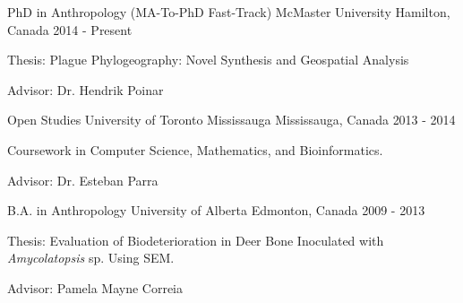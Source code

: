 

\begin{cventries}
  \cventry
    {PhD in Anthropology (MA-To-PhD Fast-Track)} %
    {McMaster University} %
    {Hamilton, Canada} %
    {2014 - Present} %
    {
      \begin{cvitems} %
        \item {Thesis:  Plague Phylogeography: Novel Synthesis and Geospatial Analysis}
         \item {Advisor: Dr. Hendrik Poinar}
      \end{cvitems}
    }
  \cventry
    {Open Studies} %
    {University of Toronto Mississauga} %
    {Mississauga, Canada} %
    {2013 - 2014} %
    {
      \begin{cvitems} %
        \item {Coursework in Computer Science, Mathematics, and Bioinformatics.}
        \item {Advisor: Dr. Esteban Parra}
      \end{cvitems}
    }
  \cventry
    {B.A. in Anthropology} %
    {University of Alberta} %
    {Edmonton, Canada} %
    {2009 - 2013} %
    {
      \begin{cvitems} %
        \item {Thesis:  Evaluation of Biodeterioration in Deer Bone Inoculated with \textit{Amycolatopsis} sp. Using SEM.}
                \item {Advisor: Pamela Mayne Correia}
      \end{cvitems}
    }

\end{cventries}
